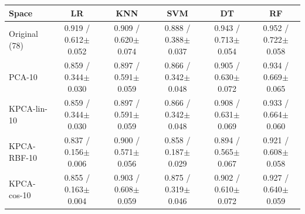 \begin{tabular}{lccccc}
\toprule
Space & LR & KNN & SVM & DT & RF \\
\midrule
Original (78) & 0.919 / 0.612$\pm$0.052 & 0.909 / 0.620$\pm$0.074 & 0.888 / 0.388$\pm$0.037 & 0.943 / 0.713$\pm$0.054 & 0.952 / 0.722$\pm$0.058 \\
PCA-10 & 0.859 / 0.344$\pm$0.030 & 0.897 / 0.591$\pm$0.059 & 0.866 / 0.342$\pm$0.048 & 0.905 / 0.630$\pm$0.072 & 0.934 / 0.669$\pm$0.065 \\
KPCA-lin-10 & 0.859 / 0.344$\pm$0.030 & 0.897 / 0.591$\pm$0.059 & 0.866 / 0.342$\pm$0.048 & 0.908 / 0.631$\pm$0.069 & 0.933 / 0.664$\pm$0.060 \\
KPCA-RBF-10 & 0.837 / 0.156$\pm$0.006 & 0.900 / 0.571$\pm$0.056 & 0.858 / 0.187$\pm$0.029 & 0.894 / 0.565$\pm$0.067 & 0.921 / 0.608$\pm$0.058 \\
KPCA-cos-10 & 0.855 / 0.163$\pm$0.004 & 0.903 / 0.608$\pm$0.059 & 0.875 / 0.319$\pm$0.046 & 0.902 / 0.610$\pm$0.072 & 0.927 / 0.640$\pm$0.059 \\
\bottomrule
\end{tabular}
